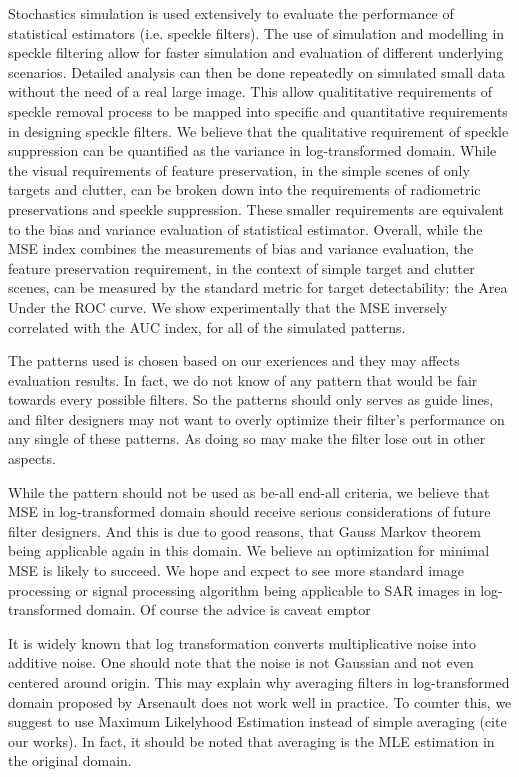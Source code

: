 Stochastics simulation is used extensively to evaluate the performance of statistical estimators (i.e. speckle filters). 
The use of simulation and modelling in speckle filtering allow for faster simulation and evaluation of different underlying scenarios. 
Detailed analysis can then be done repeatedly on simulated small data without the need of a real large image. 
This allow qualititative requirements of speckle removal process to be mapped into specific and quantitative requirements in designing speckle filters. 
We believe that the qualitative requirement of speckle suppression can be quantified as the variance in log-transformed domain. 
While the visual requirements of feature preservation, in the simple scenes of only targets and clutter, can be broken down into the requirements of radiometric preservations and speckle suppression.
These smaller requirements are equivalent to the bias and variance evaluation of statistical estimator.
Overall, while the MSE index combines the measurements of bias and variance evaluation, 
	the feature preservation requirement, in the context of simple target and clutter scenes, can be measured by the standard metric for target detectability: the Area Under the ROC curve.
We show experimentally that the MSE inversely correlated with the AUC index, for all of the simulated patterns.

The patterns used is chosen based on our exeriences and they may affects evaluation results. 
In fact, we do not know of any pattern that would be fair towards every possible filters.
So the patterns should only serves as guide lines, and filter designers may not want to overly optimize their filter's performance on any single of these patterns.
As doing so may make the filter lose out in other aspects.

While the pattern should not be used as be-all end-all criteria, we believe that MSE in log-transformed domain should receive serious considerations of future filter designers.
And this is due to good reasons, that Gauss Markov theorem being applicable again in this domain.
We believe an optimization for minimal MSE is likely to succeed.
We hope and expect to see more standard image processing or signal processing algorithm being applicable to SAR images in log-transformed domain. 
Of course the advice is caveat emptor

It is widely known that log transformation converts multiplicative noise into additive noise. 
One should note that the noise is not Gaussian and not even centered around origin.
This may explain why averaging filters in log-transformed domain proposed by Arsenault does not work well in practice.
To counter this, we suggest to use Maximum Likelyhood Estimation instead of simple averaging (cite our works).
In fact, it should be noted that averaging is the MLE estimation in the original domain.

